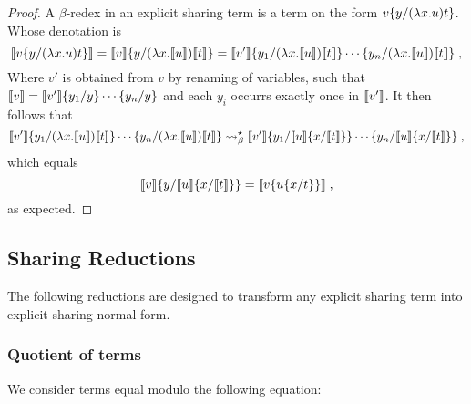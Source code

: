 \documentclass[10pt,a4paper]{article}
\theoremstyle{definition}
\theoremstyle{plain}
\theoremstyle{remark}
\begin{document}
% 

\begin{proof}
A $\beta$-redex in an explicit sharing term is a term on the form ${ {v}\{{y}/{{({{\lambda{x}.{u}}}){t}}}\} }$. Whose denotation is
\[
{\llbracket{ { {v}\{{y}/{ {({ {\lambda{x}.{u}} }){t}} }\} } }\rrbracket}={ {{\llbracket{v}\rrbracket}}\{{y}/{{({{\lambda{x}.{{\llbracket{u}\rrbracket}}}}){{\llbracket{t}\rrbracket}}}}\} }=
{{{\llbracket{v'}\rrbracket}}\{{y_1}/{{({{\lambda{x}.{{\llbracket{u}\rrbracket}}}}){{\llbracket{t}\rrbracket}}}}\}\cdots\{{y_n}/{{({{\lambda{x}.{{\llbracket{u}\rrbracket}}}}){{\llbracket{t}\rrbracket}}}}\}}\;,
\]
Where $v'$ is obtained from $v$ by renaming of variables, such that ${\llbracket{v}\rrbracket}={{{\llbracket{v'}\rrbracket}}\{{y_1}/{y}\}\cdots\{{y_n}/{y}\}}$ and each $y_i$ occurrs exactly once in ${\llbracket{v'}\rrbracket}$. It then follows that
\[
{{{\llbracket{v'}\rrbracket}}\{{y_1}/{{({{\lambda{x}.{{\llbracket{u}\rrbracket}}}}){{\llbracket{t}\rrbracket}}}}\}\cdots\{{y_n}/{{({{\lambda{x}.{{\llbracket{u}\rrbracket}}}}){{\llbracket{t}\rrbracket}}}}\}}\rightsquigarrow_\beta^\star{{{\llbracket{v'}\rrbracket}}\{{y_1}/{ { {{\llbracket{u}\rrbracket}}\{{x}/{{\llbracket{t}\rrbracket}}\} } }\}\cdots\{{y_n}/{ { {{\llbracket{u}\rrbracket}}\{{x}/{{\llbracket{t}\rrbracket}}\} } }\}}\;,
\]
which equals
\[
{ {{\llbracket{v}\rrbracket}}\{{y}/{{ {{\llbracket{u}\rrbracket}}\{{x}/{{\llbracket{t}\rrbracket}}\} }}\} }={\llbracket{v\{ { {u}\{{x}/{t}\} } \}}\rrbracket}\;,
\]
as expected.
\end{proof}

\subsection{Sharing Reductions}

The following reductions are designed to transform any explicit sharing term into explicit sharing normal form.

\subsubsection{Quotient of terms}

We consider terms equal modulo the following equation:
\end{document}

